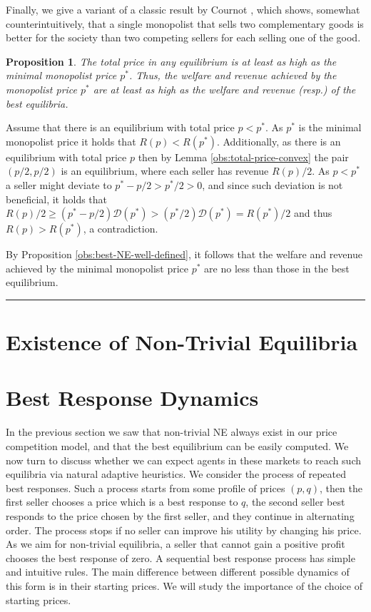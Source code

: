 \documentclass[11pt,a4paper]{article}
\newcommand{\qed}{\rule{1.5mm}{2mm}\vspace{0.1in}}
\newenvironment{proof}{\par\noindent{\bf Proof:}}{\qed}
\newtheorem{proposition}[theorem]{Proposition}
\begin{document}
Finally, we give a variant of a classic result by Cournot \cite{Cournot1838}, which shows, somewhat counterintuitively, that
a single monopolist that sells two complementary goods is better for the society than two competing sellers for each selling one of the good. %
\begin{proposition}
	The total price in any equilibrium is at least as high as the minimal monopolist price $p^*$.
	Thus, the welfare and revenue achieved by the monopolist price $p^*$
	are at least as high as the welfare and revenue (resp.) of the best equilibria.
\end{proposition}
\begin{proof}
	Assume that there is an equilibrium with total price $p<p^*$. As $p^*$ is the minimal monopolist price it holds that $R(p)<R(p^*)$. Additionally, as there is an equilibrium with total price $p$ then by Lemma \ref{obs:total-price-convex} the pair $(p/2,p/2)$ is  an equilibrium, where each seller has revenue $R(p)/2$.
	As $p<p^*$ a seller might deviate to $p^*-p/2>p^*/2>0$, and since such deviation is not beneficial, it holds that
	$R(p)/2 \geq (p^*-p/2) \mathcal{D}(p^*)> (p^*/2) \mathcal{D}(p^*) = R(p^*)/2$ and thus $R(p)>R(p^*)$, a contradiction.

By Proposition \ref{obs:best-NE-well-defined}, it follows that the welfare and revenue achieved by the minimal monopolist price $p^*$ are no less than those in the best equilibrium.
\end{proof}


	
\section{Existence of Non-Trivial Equilibria}	
\label{sec:existence}


\section{Best Response Dynamics}
\label{sec:best-response}

In the previous section we saw that non-trivial NE always exist in our price competition model, and that the best equilibrium can be easily computed. We now turn to discuss whether we can expect agents in these markets to reach such equilibria via natural adaptive heuristics.
We consider the process of repeated best responses. Such a process starts from some profile of prices $(p,q)$, then the first seller chooses a price which is a best response to $q$, the second seller best responds to the price chosen by the first seller, and they continue in alternating order. The process stops if no seller can improve his utility by changing his price. As we aim for non-trivial equilibria, a seller that cannot gain a positive profit chooses the best response of zero.
A sequential best response process has simple and intuitive rules.
The main difference between different possible dynamics of this form is in their starting prices.
We will study the importance of the choice of starting prices.
\end{document}
